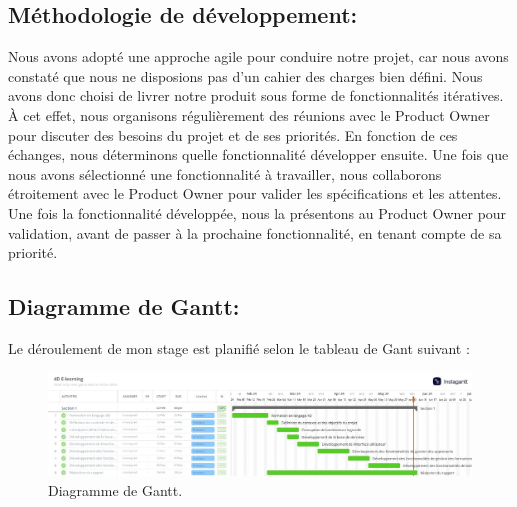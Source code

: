 \subsection{Méthodologie de développement:}

Nous avons adopté une approche agile pour conduire notre projet, car nous avons constaté que nous ne disposions pas d'un cahier des charges bien défini. Nous avons donc choisi de livrer notre produit sous forme de fonctionnalités itératives. À cet effet, nous organisons régulièrement des réunions avec le Product Owner pour discuter des besoins du projet et de ses priorités. En fonction de ces échanges, nous déterminons quelle fonctionnalité développer ensuite. Une fois que nous avons sélectionné une fonctionnalité à travailler, nous collaborons étroitement avec le Product Owner pour valider les spécifications et les attentes.
Une fois la fonctionnalité développée, nous la présentons au Product Owner pour validation, avant de passer à la prochaine fonctionnalité, en tenant compte de sa priorité. 


\subsection{Diagramme de Gantt:}

Le déroulement de mon stage est planifié selon le tableau de Gant suivant :

\begin{figure}[H]
    \centering
    \includegraphics[width=18cm]{Figures/DiagrammeDeGantt.jpg}
    \caption{Diagramme de Gantt.}
\end{figure}




